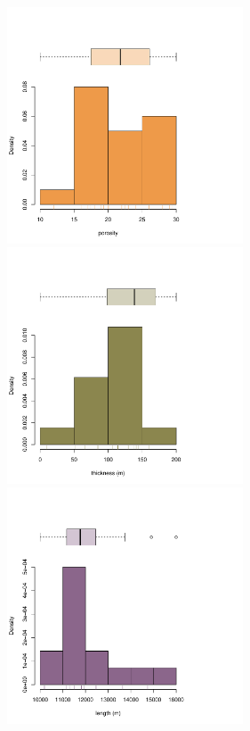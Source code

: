 \documentclass[review,authoryear, 12pt]{elsarticle}\usepackage[]{graphicx}\usepackage[]{color}
\newenvironment{knitrout}{}{} %
\begin{document}
\begin{knitrout}
\color{fgcolor}\begin{figure}[]

\includegraphics[width=7cm,height=7cm]{figure/histplots1} 
\includegraphics[width=7cm,height=7cm]{figure/histplots2} 
\includegraphics[width=7cm,height=7cm]{figure/histplots3} 

\end{figure}
\end{knitrout}
\end{document}
